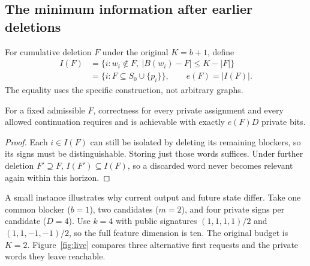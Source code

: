 \subsection{The minimum information after earlier deletions}
For cumulative deletion $F$ under the original $K=b+1$, define
\begin{align}
 I(F)&=\{i:w_i\notin F,\ |B(w_i)\minus F|\le K-|F|\}\nonumber\\
     &=\{i:F\subseteq S_0\cup\{p_i\}\},\qquad e(F)=|I(F)|.\label{eq:live}
\end{align}
The equality uses the specific construction, not arbitrary graphs.

\begin{corollary}\label{cor:live}
For a fixed admissible $F$, correctness for every private assignment and
every allowed continuation requires and is achievable with exactly
$e(F)D$ private bits.
\end{corollary}
\begin{proof}
Each $i\in I(F)$ can still be isolated by deleting its remaining blockers,
so its signs must be distinguishable. Storing just those words suffices.
Under further deletion $F'\supseteq F$, $I(F')\subseteq I(F)$, so a
discarded word never becomes relevant again within this horizon.
\end{proof}

A small instance illustrates why current output and future state differ.
Take one common blocker ($b=1$), two candidates ($m=2$), and four private
signs per candidate ($D=4$). Use $k=4$ with public signatures
$(1,1,1,1)/2$ and $(1,1,-1,-1)/2$, so the full feature dimension is ten.
The original budget is $K=2$. Figure~\ref{fig:live} compares three
alternative first requests and the private words they leave reachable.


